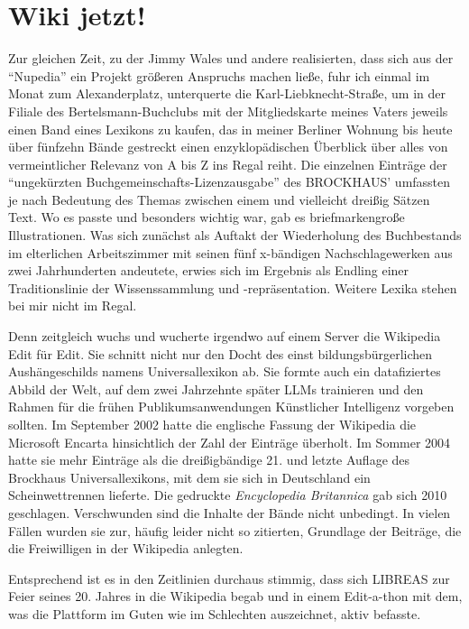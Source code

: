 \documentclass[a4paper,
fontsize=11pt,
oneside,
numbers=noperiodatend,
parskip=half-,
bibliography=totoc,
final
]{scrartcl}
\begin{document}
\section{Wiki jetzt!}\label{wiki-jetzt}

Zur gleichen Zeit, zu der Jimmy Wales und andere realisierten, dass sich
aus der \enquote{Nupedia} ein Projekt größeren Anspruchs machen ließe,
fuhr ich einmal im Monat zum Alexanderplatz, unterquerte die
Karl-Liebknecht-Straße, um in der Filiale des Bertelsmann-Buchclubs mit
der Mitgliedskarte meines Vaters jeweils einen Band eines Lexikons zu
kaufen, das in meiner Berliner Wohnung bis heute über fünfzehn Bände
gestreckt einen enzyklopädischen Überblick über alles von vermeintlicher
Relevanz von A bis Z ins Regal reiht. Die einzelnen Einträge der
\enquote{ungekürzten Buchgemeinschafts-Lizenzausgabe} des BROCKHAUS'
umfassten je nach Bedeutung des Themas zwischen einem und vielleicht
dreißig Sätzen Text. Wo es passte und besonders wichtig war, gab es
briefmarkengroße Illustrationen. Was sich zunächst als Auftakt der
Wiederholung des Buchbestands im elterlichen Arbeitszimmer mit seinen
fünf x-bändigen Nachschlagewerken aus zwei Jahrhunderten andeutete,
erwies sich im Ergebnis als Endling einer Traditionslinie der
Wissenssammlung und -repräsentation. Weitere Lexika stehen bei mir nicht
im Regal.

Denn zeitgleich wuchs und wucherte irgendwo auf einem Server die
Wikipedia Edit für Edit. Sie schnitt nicht nur den Docht des einst
bildungsbürgerlichen Aushängeschilds namens Universallexikon ab. Sie
formte auch ein datafiziertes Abbild der Welt, auf dem zwei Jahrzehnte
später LLMs trainieren und den Rahmen für die frühen
Publikumsanwendungen Künstlicher Intelligenz vorgeben sollten. Im
September 2002 hatte die englische Fassung der Wikipedia die Microsoft
Encarta hinsichtlich der Zahl der Einträge überholt. Im Sommer 2004
hatte sie mehr Einträge als die dreißigbändige 21. und letzte Auflage
des Brockhaus Universallexikons, mit dem sie sich in Deutschland ein
Scheinwettrennen lieferte. Die gedruckte \emph{Encyclopedia Britannica}
gab sich 2010 geschlagen. Verschwunden sind die Inhalte der Bände nicht
unbedingt. In vielen Fällen wurden sie zur, häufig leider nicht so
zitierten, Grundlage der Beiträge, die die Freiwilligen in der Wikipedia
anlegten.

Entsprechend ist es in den Zeitlinien durchaus stimmig, dass sich
LIBREAS zur Feier seines 20. Jahres in die Wikipedia begab und in einem
Edit-a-thon mit dem, was die Plattform im Guten wie im Schlechten
auszeichnet, aktiv befasste.
\end{document}
